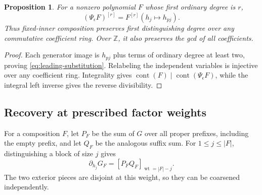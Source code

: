 \documentclass[11pt,a4paper]{amsart}
\numberwithin{equation}{section}
\theoremstyle{plain}
\newtheorem{proposition}[theorem]{Proposition}
\theoremstyle{definition}
\newcommand{\Z}{\mathbb Z}
\newcommand{\wt}{\operatorname{wt}}
\DeclareMathOperator{\content}{cont}
\begin{document}
\begin{proposition}\label{prop:depth-cancel}
For a nonzero polynomial \(F\) whose first ordinary degree is \(r\),
\begin{equation}\label{eq:leading-substitution}
(\Psi_\epsilon F)^{[r]}=F^{[r]}(h_j\mapsto h_{pj}).
\end{equation}
Thus fixed-inner composition preserves first distinguishing degree over
any commutative coefficient ring.  Over \(\Z\), it also preserves the gcd
of all coefficients.
\end{proposition}
\begin{proof}
Each generator image is \(h_{pj}\) plus terms of ordinary degree at least
two, proving \eqref{eq:leading-substitution}.  Relabeling the independent
variables is injective over any coefficient ring.  Integrality gives
\(\content(F)\mid\content(\Psi_\epsilon F)\), while the integral left
inverse gives the reverse divisibility.
\end{proof}

\subsection{Recovery at prescribed factor weights}
For a composition \(F\), let \(P_F\) be the sum of \(G\) over all proper prefixes,
including the empty prefix, and let \(Q_F\) be the analogous suffix sum.
For \(1\le j\le|F|\), distinguishing a block of size \(j\) gives
\[
\partial_{h_j}G_F=[P_FQ_F]_{\wt=|F|-j}.
\]
The two exterior pieces are disjoint at this weight, so they can be
coarsened independently.
\end{document}
